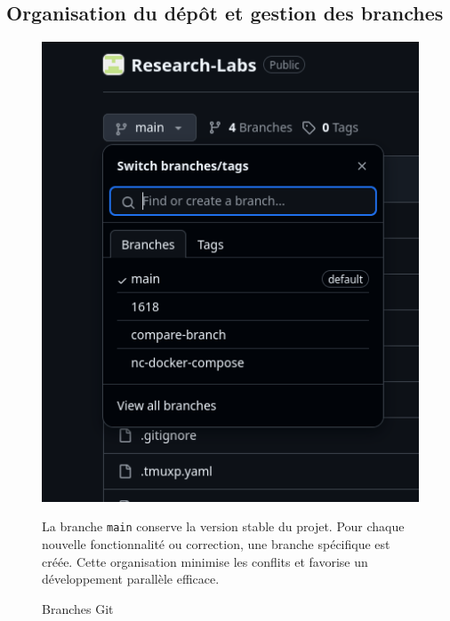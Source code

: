 \documentclass[12pt]{rapportPfe}
\begin{document}
\subsection{Organisation du dépôt et gestion des branches}

\begin{figure}[H]
    \centering
    \begin{minipage}[t]{0.3\textwidth}
        \vspace{0pt} 
        \includegraphics[width=\textwidth]{diagrams/ss_04.png}
        \caption{Branches Git}
        \label{fig:diagram5}
    \end{minipage}
    \hfill
    \begin{minipage}[t]{0.65\textwidth}
        \vspace{80pt} 
        \noindent La branche \texttt{main} conserve la version stable du projet. Pour chaque nouvelle fonctionnalité ou correction, une branche spécifique est créée. Cette organisation minimise les conflits et favorise un développement parallèle efficace.
    \end{minipage}
\end{figure}
\end{document}
